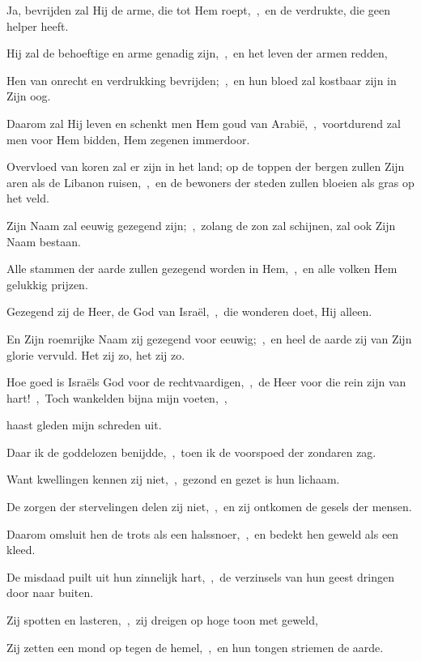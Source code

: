 \documentclass[12pt,twoside,a5paper]{article}
\begin{document}
\begin{halfparskip}
  Ja, bevrijden zal Hij de arme, die tot Hem roept,~\sep\ en de verdrukte, die geen helper heeft.

  Hij zal de behoeftige en arme genadig zijn,~\sep\ en het leven der armen redden,

  Hen van onrecht en verdrukking bevrijden;~\sep\ en hun bloed zal kostbaar zijn in Zijn oog.

  Daarom zal Hij leven en schenkt men Hem goud van Arabië,~\sep\ voortdurend zal men voor Hem bidden, Hem zegenen immerdoor.

  Overvloed van koren zal er zijn in het land; op de toppen der bergen zullen Zijn aren als de Libanon ruisen,~\sep\ en de bewoners der steden zullen bloeien als gras op het veld.

  Zijn Naam zal eeuwig gezegend zijn;~\sep\ zolang de zon zal schijnen, zal ook Zijn Naam bestaan.

  Alle stammen der aarde zullen gezegend worden in Hem,~\sep\ en alle volken Hem gelukkig prijzen.

  Gezegend zij de Heer, de God van Israël,~\sep\ die wonderen doet, Hij alleen.

  En Zijn roemrijke Naam zij gezegend voor eeuwig;~\sep\ en heel de aarde zij van Zijn glorie vervuld. Het zij zo, het zij zo.
\end{halfparskip}





\begin{halfparskip}
  Hoe goed is Israëls God voor de rechtvaardigen,~\sep\ de Heer voor die rein zijn van hart!~\sep\ Toch wankelden bijna mijn voeten,~\sep


  haast gleden mijn schreden uit.

  Daar ik de goddelozen benijdde,~\sep\ toen ik de voorspoed der zondaren zag.

  Want kwellingen kennen zij niet,~\sep\ gezond en gezet is hun lichaam.

  De zorgen der stervelingen delen zij niet,~\sep\ en zij ontkomen de gesels der mensen.

  Daarom omsluit hen de trots als een halssnoer,~\sep\ en bedekt hen geweld als een kleed.

  De misdaad puilt uit hun zinnelijk hart,~\sep\ de verzinsels van hun geest dringen door naar buiten.

  Zij spotten en lasteren,~\sep\ zij dreigen op hoge toon met geweld,

  Zij zetten een mond op tegen de hemel,~\sep\ en hun tongen striemen de aarde.
\end{halfparskip}
\end{document}
